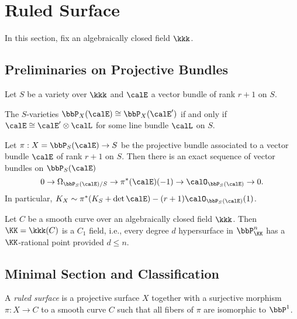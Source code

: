 \section{Ruled Surface}

In this section, fix an algebraically closed field $\kkk$.

\subsection{Preliminaries on Projective Bundles}

    Let \(S\) be a variety over \(\kkk\) and \(\calE\) a vector bundle of rank \(r+1\) on \(S\).

    \begin{proposition}\label{prop:isomorphic_projective_bundle_iff_twist_by_line_bundle}
        The \(S\)-varieties \(\bbP_X(\calE) \cong \bbP_X(\calE')\) if and only if \(\calE \cong \calE' \otimes \calL\) for some line bundle \(\calL\) on \(S\).
    \end{proposition}

    \begin{theorem}\label{thm:Eulur_sequence_for_projective_bundle}
        Let \(\pi: X=\bbP_S(\calE) \to S\) be the projective bundle associated to a vector bundle \(\calE\) of rank \(r+1\) on \(S\). 
        Then there is an exact sequence of vector bundles on \(\bbP_S(\calE)\)
        \[
            0 \to \Omega_{\bbP_S(\calE)/S} \to \pi^*(\calE)(-1) \to \calO_{\bbP_S(\calE)} \to 0.
        \]
        In particular, \(K_X \sim \pi^*(K_S + \det \calE) - (r+1)\calO_{\bbP_S(\calE)}(1)\).
    \end{theorem}

    \begin{theorem}\label{thm:Tsen_theorem}
        Let \(C\) be a smooth curve over an algebraically closed field \(\kkk\). 
        Then \(\KK=\kkk(C)\) is a \(C_1\) field, i.e., every degree \(d\) hypersurface in \(\bbP^n_{\KK}\) has a \(\KK\)-rational point provided \(d \leq n\).
    \end{theorem}

\subsection{Minimal Section and Classification}

    \begin{definition}\label{def:ruled_surface}
        A \emph{ruled surface} is a projective surface \(X\) together with a surjective morphism \(\pi:X \to C\) to a smooth curve \(C\) such that all fibers of \(\pi\) are isomorphic to \(\bbP^1\).
    \end{definition}

